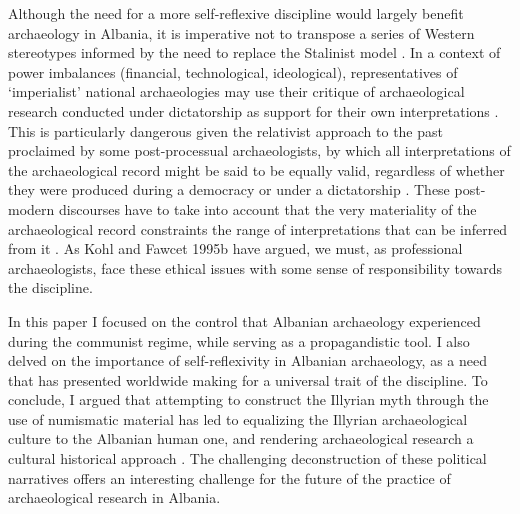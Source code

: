 	
	Although the need for a more self-reflexive discipline would largely benefit archaeology in Albania, it is imperative not to transpose a series of Western stereotypes informed by the need to replace the Stalinist model \parencite[161]{Hodges2004}. In a context of power imbalances (financial, technological, ideological), representatives of `imperialist' national archaeologies \parencite[Trigger 1984 cited in][]{Galaty2006} may use their critique of archaeological research conducted under dictatorship as support for their own interpretations \parencite[13]{Galaty2006}. This is particularly dangerous given the relativist approach to the past proclaimed by some post-processual archaeologists, by which all interpretations of the archaeological record might be said to be equally valid, regardless of whether they were produced during a democracy or under a dictatorship \parencite[Meskell 1998 cited in][]{Galaty2006}. These post-modern discourses \parencite[Meskell 1998 cited in][]{Galaty2006} have to take into account that the very materiality of the archaeological record constraints the range of interpretations that can be inferred from it \parencite[200]{Hodder1999}. 
	As Kohl and Fawcet 1995b  \parencite[cited in][]{Galaty2006} have argued, we must, as professional archaeologists, face these ethical issues with some sense of responsibility towards the discipline.
	
	In this paper I focused on the control that Albanian archaeology experienced during the communist regime, while serving as a propagandistic tool. I also delved on the importance of self-reflexivity in Albanian archaeology, as a need that has presented worldwide making for a universal trait of the discipline. To conclude, I argued that attempting to construct the Illyrian myth through the use of numismatic material has led to equalizing the Illyrian archaeological culture to the Albanian human one, and rendering archaeological research a cultural historical approach \parencite[18]{Johnson2010}. The challenging deconstruction of these political narratives offers an interesting challenge for the future of the practice of archaeological research in Albania.
			
